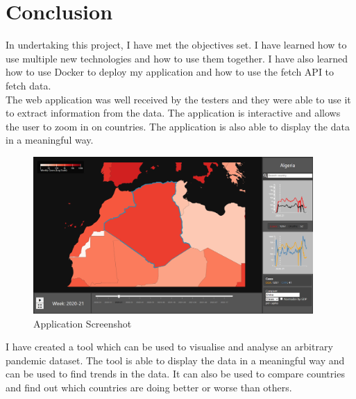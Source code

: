 \documentclass{report}
\begin{document}
\newpage

\chapter{Conclusion}
In undertaking this project, I have met the objectives set. I have learned how to use multiple new technologies and how to use them together. I have also learned how to use Docker to deploy my application and how to use the fetch API to fetch data.\\

The web application was well received by the testers and they were able to use it to extract information from the data. The application is interactive and allows the user to zoom in on countries. The application is also able to display the data in a meaningful way.

\begin{center}
    \begin{figure}[h]
        \centering
        \includegraphics[width=0.95\textwidth]{Images/dashboard.png}
        \caption{Application Screenshot}
        \label{fig:dashboard-conc}
    \end{figure}
\end{center}
I have created a tool which can be used to visualise and analyse an arbitrary pandemic dataset. The tool is able to display the data in a meaningful way and can be used to find trends in the data. It can also be used to compare countries and find out which countries are doing better or worse than others.\\
\newpage
\end{document}
